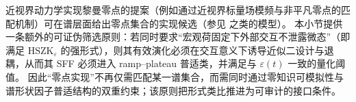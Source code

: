 \begin{remark}\label{rem:discussion-zk-filter-zero-realization}
近视界动力学实现黎曼零点的提案（例如通过近视界标量场模频与非平凡零点的匹配机制）可在谱层面给出零点集合的实现候选（参见 \cite{Giri2010PhysicalRealizationRiemannZerosBlackHole} 之类的模型）。
本小节提供一条额外的可证伪筛选原则：若同时要求“宏观荷固定下外部交互不泄露微态”（即满足 \(\mathrm{HSZK}_\varepsilon\) 的强形式），则其有效演化必须在交互意义下诱导近似二设计与退耦，从而其 SFF 必须进入 ramp--plateau 普适类，并满足与 \(\varepsilon(t)\) 一致的量化阈值。
因此“零点实现”不再仅需匹配某一谱集合，而需同时通过零知识可模拟性与谱形状因子普适结构的双重约束；该原则把形式类比推进为可审计的接口条件。
\end{remark}

\endinput
